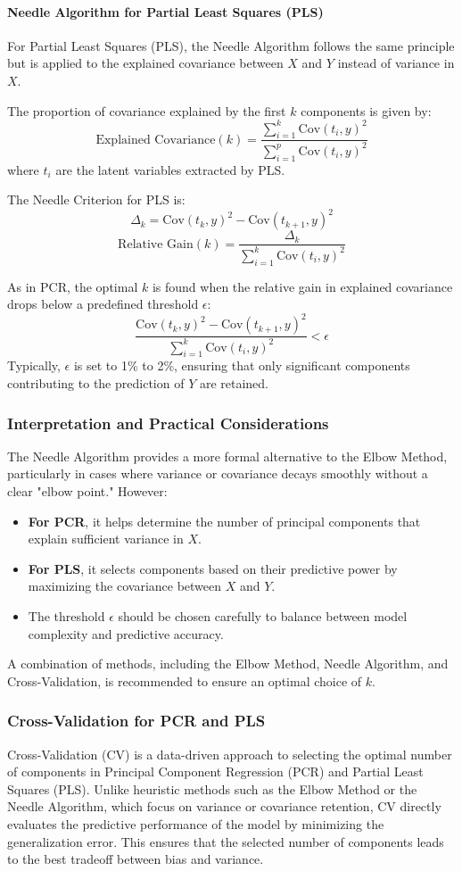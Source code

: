 \documentclass[11pt,twoside,a4paper]{article}
\begin{document}
\paragraph{Needle Algorithm for Partial Least Squares (PLS)}
For Partial Least Squares (PLS), the Needle Algorithm follows the same principle but is applied to the explained covariance between \( X \) and \( Y \) instead of variance in \( X \). 

The proportion of covariance explained by the first \( k \) components is given by:
\[
\text{Explained Covariance}(k) = \frac{\sum_{i=1}^{k} \text{Cov}(t_i, y)^2}{\sum_{i=1}^{p} \text{Cov}(t_i, y)^2}
\]
where \( t_i \) are the latent variables extracted by PLS.

The Needle Criterion for PLS is:
\[
\Delta_k = \text{Cov}(t_k, y)^2 - \text{Cov}(t_{k+1}, y)^2
\]
\[
\text{Relative Gain}(k) = \frac{\Delta_k}{\sum_{i=1}^{k} \text{Cov}(t_i, y)^2}
\]

As in PCR, the optimal \( k \) is found when the relative gain in explained covariance drops below a predefined threshold \( \epsilon \):
\[
\frac{\text{Cov}(t_k, y)^2 - \text{Cov}(t_{k+1}, y)^2}{\sum_{i=1}^{k} \text{Cov}(t_i, y)^2} < \epsilon
\]
Typically, \( \epsilon \) is set to 1\% to 2\%, ensuring that only significant components contributing to the prediction of \( Y \) are retained.

\subsubsection{Interpretation and Practical Considerations}
The Needle Algorithm provides a more formal alternative to the Elbow Method, particularly in cases where variance or covariance decays smoothly without a clear "elbow point." However:
\begin{itemize}
    \item \textbf{For PCR}, it helps determine the number of principal components that explain sufficient variance in \( X \).
    \item \textbf{For PLS}, it selects components based on their predictive power by maximizing the covariance between \( X \) and \( Y \).
    \item The threshold \( \epsilon \) should be chosen carefully to balance between model complexity and predictive accuracy.
\end{itemize}
A combination of methods, including the Elbow Method, Needle Algorithm, and Cross-Validation, is recommended to ensure an optimal choice of \( k \).
\subsubsection{Cross-Validation for PCR and PLS}
Cross-Validation (CV) is a data-driven approach to selecting the optimal number of components in Principal Component Regression (PCR) and Partial Least Squares (PLS). Unlike heuristic methods such as the Elbow Method or the Needle Algorithm, which focus on variance or covariance retention, CV directly evaluates the predictive performance of the model by minimizing the generalization error. This ensures that the selected number of components leads to the best tradeoff between bias and variance.
\end{document}
